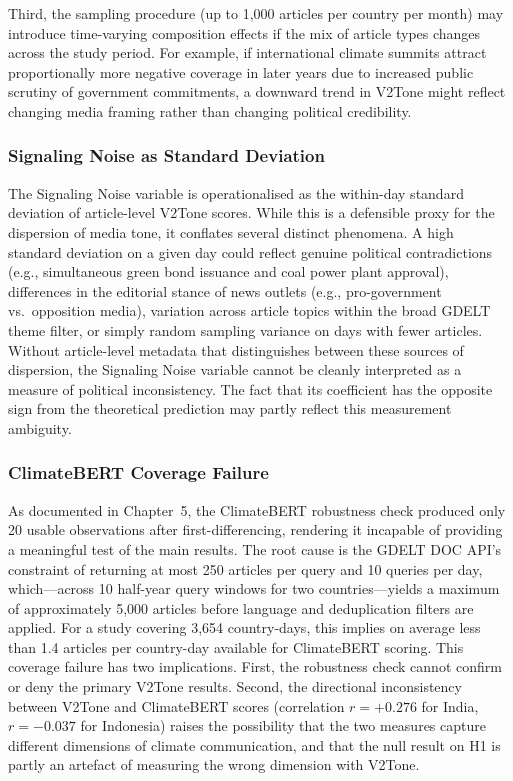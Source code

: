 \documentclass[12pt,a4paper]{article}
\begin{document}
Third, the sampling procedure (up to 1,000 articles per country per month) may introduce time-varying composition effects if the mix of article types changes across the study period. For example, if international climate summits attract proportionally more negative coverage in later years due to increased public scrutiny of government commitments, a downward trend in V2Tone might reflect changing media framing rather than changing political credibility.

\subsubsection{Signaling Noise as Standard Deviation}

The Signaling Noise variable is operationalised as the within-day standard deviation of article-level V2Tone scores. While this is a defensible proxy for the dispersion of media tone, it conflates several distinct phenomena. A high standard deviation on a given day could reflect genuine political contradictions (e.g., simultaneous green bond issuance and coal power plant approval), differences in the editorial stance of news outlets (e.g., pro-government vs.\ opposition media), variation across article topics within the broad GDELT theme filter, or simply random sampling variance on days with fewer articles. Without article-level metadata that distinguishes between these sources of dispersion, the Signaling Noise variable cannot be cleanly interpreted as a measure of political inconsistency. The fact that its coefficient has the opposite sign from the theoretical prediction may partly reflect this measurement ambiguity.

\subsubsection{ClimateBERT Coverage Failure}

As documented in Chapter~5, the ClimateBERT robustness check produced only 20 usable observations after first-differencing, rendering it incapable of providing a meaningful test of the main results. The root cause is the GDELT DOC API's constraint of returning at most 250 articles per query and 10 queries per day, which---across 10 half-year query windows for two countries---yields a maximum of approximately 5,000 articles before language and deduplication filters are applied. For a study covering 3,654 country-days, this implies on average less than 1.4 articles per country-day available for ClimateBERT scoring. This coverage failure has two implications. First, the robustness check cannot confirm or deny the primary V2Tone results. Second, the directional inconsistency between V2Tone and ClimateBERT scores (correlation $r = +0.276$ for India, $r = -0.037$ for Indonesia) raises the possibility that the two measures capture different dimensions of climate communication, and that the null result on H1 is partly an artefact of measuring the wrong dimension with V2Tone.
\end{document}
